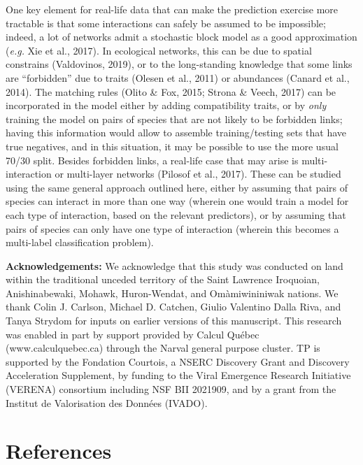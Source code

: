 \documentclass[10pt,oneside]{article}
\begin{document}
One key element for real-life data that can make the prediction exercise
more tractable is that some interactions can safely be assumed to be
impossible; indeed, a lot of networks admit a stochastic block model as
a good approximation (\emph{e.g.} Xie et al., 2017). In ecological
networks, this can be due to spatial constrains (Valdovinos, 2019), or
to the long-standing knowledge that some links are ``forbidden'' due to
traits (Olesen et al., 2011) or abundances (Canard et al., 2014). The
matching rules (Olito \& Fox, 2015; Strona \& Veech, 2017) can be
incorporated in the model either by adding compatibility traits, or by
\emph{only} training the model on pairs of species that are not likely
to be forbidden links; having this information would allow to assemble
training/testing sets that have true negatives, and in this situation,
it may be possible to use the more usual 70/30 split. Besides forbidden
links, a real-life case that may arise is multi-interaction or
multi-layer networks (Pilosof et al., 2017). These can be studied using
the same general approach outlined here, either by assuming that pairs
of species can interact in more than one way (wherein one would train a
model for each type of interaction, based on the relevant predictors),
or by assuming that pairs of species can only have one type of
interaction (wherein this becomes a multi-label classification problem).

\textbf{Acknowledgements:} We acknowledge that this study was conducted
on land within the traditional unceded territory of the Saint Lawrence
Iroquoian, Anishinabewaki, Mohawk, Huron-Wendat, and Omàmiwininiwak
nations. We thank Colin J. Carlson, Michael D. Catchen, Giulio Valentino
Dalla Riva, and Tanya Strydom for inputs on earlier versions of this
manuscript. This research was enabled in part by support provided by
Calcul Québec (www.calculquebec.ca) through the Narval general purpose
cluster. TP is supported by the Fondation Courtois, a NSERC Discovery
Grant and Discovery Acceleration Supplement, by funding to the Viral
Emergence Research Initiative (VERENA) consortium including NSF BII
2021909, and by a grant from the Institut de Valorisation des Données
(IVADO).

\hypertarget{references}{%
\section*{References}\label{references}}
\end{document}
